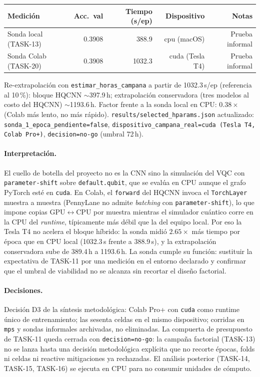 \begin{center}
\small
\begin{tabular}{lrrrr}\hline
\textbf{Medición} & \textbf{Acc.\ val} & \textbf{Tiempo (s/ep)} & \textbf{Dispositivo} & \textbf{Notas} \\\hline
Sonda local (TASK-13) & 0.3908 & 388.9 & cpu (macOS) & Prueba informal \\
Sonda Colab (TASK-20) & 0.3908 & 1032.3 & cuda (Tesla T4) & Prueba informal \\\hline
\end{tabular}
\end{center}

Re-extrapolación con \texttt{estimar\_horas\_campana} a partir de 1032.3\,s/ep (referencia al
10\,\%): bloque HQCNN $\sim$397.9\,h; extrapolación conservadora (tres modelos al costo del
HQCNN) $\sim$1193.6\,h. Factor frente a la sonda local en CPU: $0.38\times$ (Colab más lento,
no más rápido). \texttt{results/selected\_hparams.json} actualizado:
\texttt{sonda\_1\_epoca\_pendiente=false}, \texttt{dispositivo\_campana\_real=cuda (Tesla T4,
Colab Pro+)}, \texttt{decision=no-go} (umbral 72\,h).

\paragraph{Interpretación.}
El cuello de botella del proyecto no es la CNN sino la simulación del VQC con
\texttt{parameter-shift} sobre \texttt{default.qubit}, que se evalúa en CPU aunque el grafo
PyTorch esté en \texttt{cuda}. En Colab, el \texttt{forward} del HQCNN invoca el
\texttt{TorchLayer} muestra a muestra (PennyLane no admite \textit{batching} con
\texttt{parameter-shift}), lo que impone copias GPU$\leftrightarrow$CPU por muestra mientras el
simulador cuántico corre en la CPU del \textit{runtime}, típicamente más débil que la del equipo
local. Por eso la Tesla T4 no acelera el bloque híbrido: la sonda midió $2.65\times$ más tiempo
por época que en CPU local (1032.3\,s frente a 388.9\,s), y la extrapolación conservadora sube de
389.4\,h a 1193.6\,h. La sonda cumple su función: sustituir la expectativa de TASK-11 por una
medición en el entorno declarado y confirmar que el umbral de viabilidad no se alcanza sin
recortar el diseño factorial.

\paragraph{Decisiones.}
Decisión D3 de la síntesis metodológica: Colab Pro+ con \texttt{cuda} como runtime único de
entrenamiento; las sesenta celdas en el mismo dispositivo; corridas en \texttt{mps} y sondas
informales archivadas, no eliminadas. La compuerta de presupuesto de TASK-11 queda cerrada con
\texttt{decision=no-go}: la campaña factorial (TASK-13) no se lanza hasta una decisión
metodológica explícita que no recorte épocas, folds ni celdas ni reactive mitigaciones ya
rechazadas. El análisis posterior (TASK-14, TASK-15, TASK-16) se ejecuta en CPU para no consumir
unidades de cómputo.

